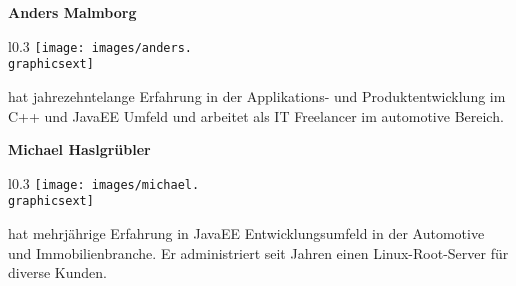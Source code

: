 \documentclass[12pt,a4paper,ngerman]{article}
\begin{document}
\newcommand{\authorboxheight}{5cm}
\begin{minipage}[t][\authorboxheight]{0.45\textwidth}
\textbf{Anders Malmborg}
\vskip0.3cm
\begin{wrapfigure}{l}{0.3\textwidth}
\vspace{-20pt}
\texttt{[image: images/anders.\\graphicsext]}
\vspace{-20pt}
\end{wrapfigure}
hat jahrezehntelange Erfahrung in der Applikations- und Produktentwicklung im C++ und JavaEE Umfeld und arbeitet als IT Freelancer im automotive Bereich. 
\end{minipage}
\hspace{0.1\textwidth}
\begin{minipage}[t][\authorboxheight]{0.45\textwidth}
\textbf{Michael Haslgrübler}
\vskip0.3cm
\begin{wrapfigure}{l}{0.3\textwidth}
\vspace{-20pt}
\texttt{[image: images/michael.\\graphicsext]}
\vspace{-20pt}
\end{wrapfigure}
hat mehrjährige Erfahrung in JavaEE Entwicklungsumfeld in der Automotive und Immobilienbranche. Er administriert seit Jahren einen Linux-Root-Server für diverse Kunden.
\end{minipage}



\end{document}
